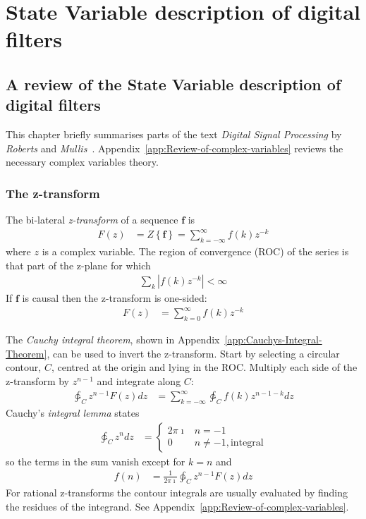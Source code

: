 \documentclass[a4paper,twoside,10pt,english]{report}
\begin{document}
\part{\label{part:State-Variable-digital-filters}State Variable description of digital filters}
\cleardoublepage{}
\chapter{\label{chap:Review-State-Variable-digital-filters}A review of the State Variable description of digital filters}
This chapter briefly summarises parts of the text 
\emph{Digital Signal Processing} by \emph{Roberts} and 
\emph{Mullis}~\cite{RobertsMullis_DigitalSignalProcessing}.
Appendix~\ref{app:Review-of-complex-variables} reviews the necessary complex
variables theory.
\section{The z-transform}
The bi-lateral \emph{z-transform} of a sequence $\boldsymbol{f}$ is
\begin{align*}
F\left(z\right) &= Z\left\{\boldsymbol{f}\right\} = 
\sum_{k=-\infty}^{\infty} f\left(k\right)z^{-k}
\end{align*}
where $z$ is a complex variable. The region of convergence (ROC) of the series
is that part of the z-plane for which
\begin{align*}
\sum_{k} \left|f\left(k\right)z^{-k}\right| < \infty
\end{align*}
If $\boldsymbol{f}$ is causal then the z-transform is one-sided:
\begin{align*}
F\left(z\right) &= \sum_{k=0}^{\infty} f\left(k\right)z^{-k}
\end{align*}

The \emph{Cauchy integral theorem}, shown in 
Appendix~\ref{app:Cauchys-Integral-Theorem}, can be used to invert the 
z-transform. Start by selecting a circular contour, $C$, centred at the origin
and lying in the ROC. Multiply each side of the z-transform by $z^{n-1}$ and
integrate along $C$:
\begin{align*}
\ointctrclockwise_{C}z^{n-1}F\left(z\right)dz &= 
\sum_{k=-\infty}^{\infty} \ointctrclockwise_{C}f\left(k\right)z^{n-1-k}dz
\end{align*}
Cauchy's \emph{integral lemma} states
\begin{align*}
\ointctrclockwise_{C}z^{n}dz &=\begin{cases}
2\pi\imath & n=-1 \\
0 & n \ne -1, \text{integral}
\end{cases}
\end{align*}
so the terms in the sum vanish except for $k=n$ and
\begin{align*}
f\left(n\right) &= 
\frac{1}{2\pi\imath}\ointctrclockwise_{C}z^{n-1}F\left(z\right)dz 
\end{align*}
For rational z-transforms the contour integrals are usually evaluated by
finding the residues of the integrand. See 
Appendix~\ref{app:Review-of-complex-variables}.
\end{document}
